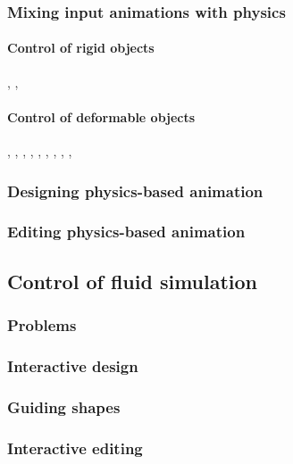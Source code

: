 \subsubsection{Mixing input animations with physics}

\paragraph{Control of rigid objects}
\cite{Witkin1988}, \cite{Popovic2000}, \cite{Popovic2003}

\paragraph{Control of deformable objects}
\cite{Kondo2005}, \cite{Bergou2007}, \cite{Martin2011}, \cite{Barbic2012}, \cite{Coros2012}, \cite{Hahn2012}, \cite{Hildebrandt2012}, \cite{Hahn2013}, \cite{Liu2013}, \cite{Li2014}

\subsubsection{Designing physics-based animation}

\subsubsection{Editing physics-based animation}
\cite{Pighin2004}

\subsection{Control of fluid simulation}

\subsubsection{Problems}

\subsubsection{Interactive design}

\subsubsection{Guiding shapes}

\subsubsection{Interactive editing}

